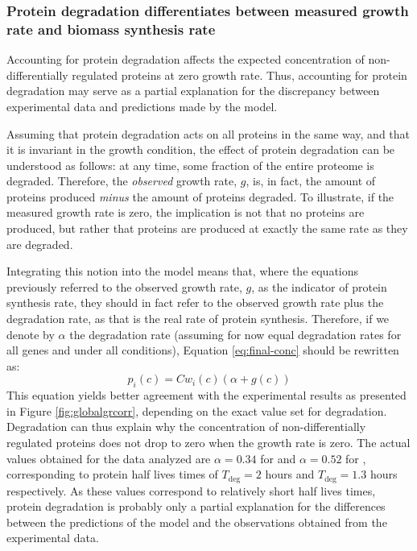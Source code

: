 \subsubsection{Protein degradation differentiates between measured growth rate and biomass synthesis rate}
Accounting for protein degradation affects the expected concentration of non-differentially regulated proteins at zero growth rate.
Thus, accounting for protein degradation may serve as a partial explanation for the discrepancy between experimental data and predictions made by the model.


Assuming that protein degradation acts on all proteins in the same way, and that it is invariant in the growth condition, the effect of protein degradation can be understood as follows: at any time, some fraction of the entire proteome is degraded.
Therefore, the \emph{observed} growth rate, $g$, is, in fact, the amount of proteins produced \emph{minus} the amount of proteins degraded.
To illustrate, if the measured growth rate is zero, the implication is not that no proteins are produced, but rather that proteins are produced at exactly the same rate as they are degraded.


Integrating this notion into the model means that, where the equations previously referred to the observed growth rate, $g$, as the indicator of protein synthesis rate, they should in fact refer to the observed growth rate plus the degradation rate, as that is the real rate of protein synthesis.
Therefore, if we denote by $\alpha$ the degradation rate (assuming for now equal degradation rates for all genes and under all conditions), Equation \ref{eq:final-conc} should be rewritten as:
\begin{equation}
  \label{eq:final-conc-deg}
  p_i(c)=Cw_i(c)(\alpha+g(c))
\end{equation}
This equation yields better agreement with the experimental results as presented in Figure \ref{fig:globalgrcorr}, depending on the exact value set for degradation.
Degradation can thus explain why the concentration of non-differentially regulated proteins does not drop to zero when the growth rate is zero.
The actual values obtained for the data analyzed are $\alpha=0.34$ for \cite{Valgepea2013} and $\alpha=0.52$ for \cite{Heinemann2014}, corresponding to protein half lives times of $T_{\text{deg}}=2$ hours and $T_{\text{deg}}=1.3$ hours respectively.
As these values correspond to relatively short half lives times, protein degradation is probably only a partial explanation for the differences between the predictions of the model and the observations obtained from the experimental data.